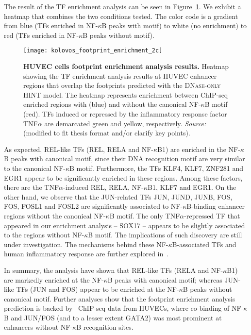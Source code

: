 The result of the TF enrichment analysis can be seen in Figure~\ref{fig:kolovos_footprint_enrichment_2c}. We exhibit a heatmap that combines the two conditions tested. The color code is a gradient from blue (TFs enriched in NF-$\kappa$B peaks with motif) to white (no enrichment) to red (TFs enriched in NF-$\kappa$B peaks without motif).

\vspace{0.5cm}

\begin{figure}[h!]
\centering
\texttt{[image: kolovos\_footprint\_enrichment\_2c]}
\caption[HUVEC cells footprint enrichment analysis results]{\textbf{HUVEC cells footprint enrichment analysis results.} Heatmap showing the TF enrichment analysis results at HUVEC enhancer regions that overlap the footprints predicted with the \textsc{DNase-only} HINT model. The heatmap represents enrichment between ChIP-seq enriched regions with (blue) and without the canonical NF-$\kappa$B motif (red). TFs induced or repressed by the inflammatory response factor TNF$\alpha$ are demarcated green and yellow, respectively. \emph{Source:~\cite{kolovos2016}} (modified to fit thesis format and/or clarify key points).}
\label{fig:kolovos_footprint_enrichment_2c}
\end{figure}

As expected, REL-like TFs (REL, RELA and NF-$\kappa$B1) are enriched in the NF-$\kappa$B peaks with canonical motif, since their DNA recognition motif are very similar to the canonical NF-$\kappa$B motif. Furthermore, the TFs KLF4, KLF7, ZNF281 and EGR1 appear to be significantly enriched in these regions. Among these factors, there are the TNF$\alpha$-induced REL, RELA, NF-$\kappa$B1, KLF7 and EGR1. On the other hand, we observe that the JUN-related TFs JUN, JUND, JUNB, FOS, FOS, FOSL1 and FOSL2 are significantly associated to NF-$\kappa$B-binding enhancer regions without the canonical NF-$\kappa$B motif. The only TNF$\alpha$-repressed TF that appeared in our enrichment analysis -- SOX17 -- appears to be slightly associated to the regions without NF-$\kappa$B motif. The implications of such discovery are still under investigation. The mechanisms behind these NF-$\kappa$B-associated TFs and human inflammatory response are further explored in~\cite{kolovos2016}.

In summary, the analysis have shown that REL-like TFs (RELA and NF-$\kappa$B1) are markedly enriched at the NF-$\kappa$B peaks with canonical motif; whereas JUN-like TFs (JUN and FOS) appear to be enriched at the NF-$\kappa$B peaks without canonical motif. Further analyses show that the footprint enrichment analysis prediction is backed by~\cite{encode2012} ChIP-seq data from HUVECs, where co-binding of NF-$\kappa$B and JUN/FOS (and to a lesser extent GATA2) was most prominent at enhancers without NF-$\kappa$B recognition sites.

